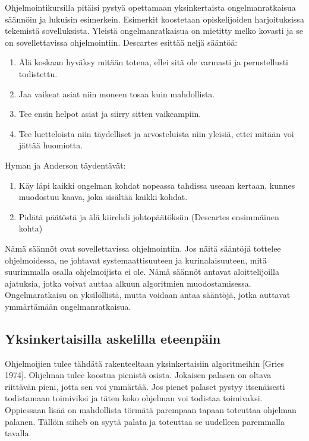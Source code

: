 \documentclass[a4paper]{article}
\begin{document}
Ohjelmointikursilla pitäisi pystyä opettamaan yksinkertaista ongelmanratkaisua säännöin ja lukuisin esimerkein. Esimerkit koostetaan opiskelijoiden harjoituksissa tekemistä sovelluksista. Yleistä ongelmanratkaisua on mietitty melko kovasti ja se on sovellettavissa ohjelmointiin. Descartes esittää neljä sääntöä:

\begin{enumerate}
  \item Älä koskaan hyväksy mitään totena, ellei sitä ole varmasti ja perustellusti todistettu.
  \item Jaa vaikeat asiat niin moneen tosaa kuin mahdollista.
  \item Tee ensin helpot asiat ja siirry sitten vaikeampiin.
  \item Tee luetteloista niin täydelliset ja arvosteluista niin yleisiä, ettei mitään voi jättää huomiotta.
\end{enumerate}

Hyman ja Anderson täydentävät:

\begin{enumerate}
  \item Käy läpi kaikki ongelman kohdat nopeassa tahdissa useaan kertaan, kunnes muodostuu kaava, joka sisältää kaikki kohdat.
  \item Pidätä päätöstä ja älä kiirehdi johtopäätöksiin (Descartes ensimmäinen kohta)
\end{enumerate}

Nämä säännöt ovat sovellettavissa ohjelmointiin. Jos näitä sääntöjä tottelee ohjelmoidessa, ne johtavat systemaattisuuteen ja kurinalaisuuteen, mitä suurimmalla osalla ohjelmoijista ei ole. Nämä säännöt antavat aloittelijoilla ajatuksia, jotka voivat auttaa alkuun algoritmien muodostamisessa. Ongelmaratkaisu on yksilöllistä, mutta voidaan antaa sääntöjä, jotka auttavat ymmärtämään ongelmanratkaisua.

\subsection{Yksinkertaisilla askelilla eteenpäin}

Ohjelmoijien tulee tähdätä rakenteeltaan yksinkertaisiin algoritmeihin [Gries 1974]. Ohjelman tulee koostua pienistä osista. Jokaisen palasen on oltava riittävän pieni, jotta sen voi ymmärtää. Jos pienet palaset pystyy itsenäisesti todistamaan toimiviksi ja täten koko ohjelman voi todistaa toimivaksi. Oppiessaan lisää on mahdollista törmätä parempaan tapaan toteuttaa ohjelman palanen. Tällöin siiheb on syytä palata ja toteuttaa se uudelleen paremmalla tavalla.
\end{document}
